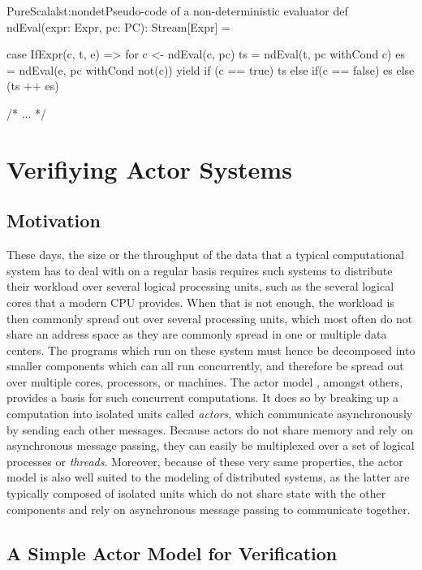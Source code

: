 \documentclass[a4paper,twoside]{article}
\begin{document}
\begin{Code}{PureScala}{lst:nondet}{Pseudo-code of a non-deterministic evaluator}
def ndEval(expr: Expr, pc: PC): Stream[Expr] = {
 case IfExpr(c, t, e) =>
  for {
    c  <- ndEval(c, pc)
    ts  = ndEval(t, pc withCond c)
    es  = ndEval(e, pc withCond not(c))
  } yield if (c == true) ts else if(c == false) es else (ts ++ es)

  /* ... */
}
\end{Code}


\clearpage
\section{Verifiying Actor Systems}
\label{actors}

\subsection{Motivation}

These days, the size or the throughput of the data that a typical computational system has to deal with on a regular basis requires such systems to distribute their workload over several logical processing units, such as the several logical cores that a modern CPU provides. When that is not enough, the workload is then commonly spread out over several processing units, which most often do not share an address space as they are commonly spread in one or multiple data centers. The programs which run on these system must hence be decomposed into smaller components which can all run concurrently, and therefore be spread out over multiple cores, processors, or machines. The actor model \cite{Hewitt, actorlaws, Agha:1986:AMC:7929}, amongst others, provides a basis for such concurrent computations. It does so by breaking up a computation into isolated units called \textit{actors}, which communicate asynchronously by sending each other messages. Because actors do not share memory and rely on asynchronous message passing, they can easily be multiplexed over a set of logical processes or \textit{threads}. Moreover, because of these very same properties, the actor model is also well suited to the modeling of distributed systems, as the latter are typically composed of isolated units which do not share state with the other components and rely on asynchronous message passing to communicate together.

\subsection{A Simple Actor Model for Verification}
\end{document}

